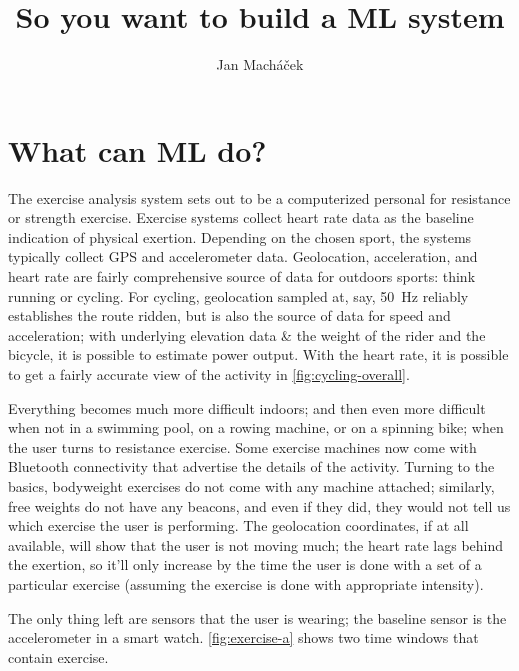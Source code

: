 



\title{So you want to build a ML system}

\author{Jan Macháček}




\section{What can ML do?}
The exercise analysis system sets out to be a computerized personal for resistance or strength exercise. Exercise systems collect heart rate data as the baseline indication of physical exertion. Depending on the chosen sport, the systems typically collect GPS and accelerometer data. Geolocation, acceleration, and heart rate are fairly comprehensive source of data for outdoors sports: think running or cycling. For cycling, geolocation sampled at, say, \SI{50}{\hertz} reliably establishes the route ridden, but is also the source of data for speed and acceleration; with underlying elevation data \& the weight of the rider and the bicycle, it is possible to estimate power output. With the heart rate, it is possible to get a  fairly accurate view of the activity in \autoref{fig:cycling-overall}.


Everything becomes much more difficult indoors; and then even more difficult when not in a swimming pool, on a rowing machine, or on a spinning bike; when the user turns to resistance exercise. Some exercise machines now come with Bluetooth connectivity that advertise the details of the activity. Turning to the basics, bodyweight exercises do not come with any machine attached; similarly, free weights do not have any beacons, and even if they did, they would not tell us which exercise the user is performing. The geolocation coordinates, if at all available, will show that the user is not moving much; the heart rate lags behind the exertion, so it'll only increase by the time the user is done with a set of a particular exercise (assuming the exercise is done with appropriate intensity).

The only thing left are sensors that the user is wearing; the baseline sensor is the accelerometer in a smart watch. \autoref{fig:exercise-a} shows two time windows that contain exercise.


\printbibliography

 